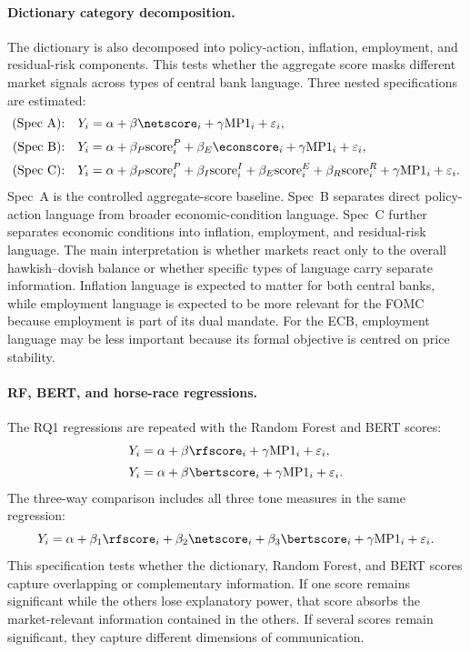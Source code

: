 \paragraph{Dictionary category decomposition.}
The dictionary is also decomposed into policy-action, inflation, employment,
and residual-risk components. This tests whether the aggregate score masks
different market signals across types of central bank language. Three nested
specifications are estimated:
%
\begin{align}
\text{(Spec~A):}\quad
Y_i &= \alpha + \beta \netscore_i
   + \gamma \text{MP1}_i + \varepsilon_i,
   \label{eq:dm_a}\\[2pt]
\text{(Spec~B):}\quad
Y_i &= \alpha
   + \beta_P \text{score}^P_i
   + \beta_E \econscore_i
   + \gamma \text{MP1}_i + \varepsilon_i,
   \label{eq:dm_b}\\[2pt]
\text{(Spec~C):}\quad
Y_i &= \alpha
   + \beta_P \text{score}^P_i
   + \beta_I \text{score}^I_i
   + \beta_E \text{score}^E_i
   + \beta_R \text{score}^R_i
   + \gamma \text{MP1}_i + \varepsilon_i.
   \label{eq:dm_c}
\end{align}
%
Spec~A is the controlled aggregate-score baseline. Spec~B separates direct
policy-action language from broader economic-condition language. Spec~C further
separates economic conditions into inflation, employment, and residual-risk
language. The main interpretation is whether markets react only to the overall
hawkish--dovish balance or whether specific types of language carry separate
information. Inflation language is expected to matter for both central banks,
while employment language is expected to be more relevant for the FOMC because
employment is part of its dual mandate. For the ECB, employment language may be
less important because its formal objective is centred on price stability.

\paragraph{RF, BERT, and horse-race regressions.}
The RQ1 regressions are repeated with the Random Forest and BERT scores:
%
\begin{align}
Y_i &= \alpha + \beta \rfscore_i
    + \gamma \text{MP1}_i + \varepsilon_i,
   \label{eq:rf_controlled}\\[2pt]
Y_i &= \alpha + \beta \bertscore_i
    + \gamma \text{MP1}_i + \varepsilon_i.
   \label{eq:bert_controlled}
\end{align}
%
The three-way comparison includes all three tone measures in the same
regression:
%
\begin{equation}
\label{eq:horserace}
Y_i = \alpha
  + \beta_1 \rfscore_i
  + \beta_2 \netscore_i
  + \beta_3 \bertscore_i
  + \gamma \text{MP1}_i
  + \varepsilon_i .
\end{equation}
%
This specification tests whether the dictionary, Random Forest, and BERT scores
capture overlapping or complementary information. If one score remains
significant while the others lose explanatory power, that score absorbs the
market-relevant information contained in the others. If several scores remain
significant, they capture different dimensions of communication.


